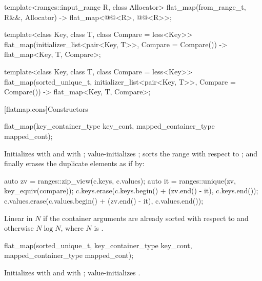 \begin{addedblock}
\begin{codeblock}
{  template<ranges::input_range R, class Allocator>
    flat_map(from_range_t, R&&, Allocator)
      -> flat_map<@@<R>, @@<R>>;

  template<class Key, class T, class Compare = less<Key>>
    flat_map(initializer_list<pair<Key, T>>, Compare = Compare())
      -> flat_map<Key, T, Compare>;

  template<class Key, class T, class Compare = less<Key>>
  flat_map(sorted_unique_t, initializer_list<pair<Key, T>>, Compare = Compare())
      -> flat_map<Key, T, Compare>;
}
\end{codeblock}

[flatmap.cons]{Constructors}

%
\begin{itemdecl}
flat_map(key_container_type key_cont, mapped_container_type mapped_cont);
\end{itemdecl}

\begin{itemdescr}
\pnum
\effects Initializes  with  and
 with ; value-initializes
; sorts the range  with respect to
; and finally erases the duplicate elements
as if by:
\begin{codeblock}
auto zv = ranges::zip_view(c.keys, c.values);
auto it = ranges::unique(zv, key_equiv(compare));
c.keys.erase(c.keys.begin() + (zv.end() - it), c.keys.end());
c.values.erase(c.values.begin() + (zv.end() - it), c.values.end());
\end{codeblock}

\pnum
\complexity
Linear in $N$ if the container arguments are already sorted with respect
to  and otherwise $N \log N$, where $N$
is .
\end{itemdescr}

%
\begin{itemdecl}
flat_map(sorted_unique_t, key_container_type key_cont, mapped_container_type mapped_cont);
\end{itemdecl}

\begin{itemdescr}
\pnum
\effects Initializes  with
 and  with
; value-initializes .


\end{itemdescr}
\end{addedblock}
